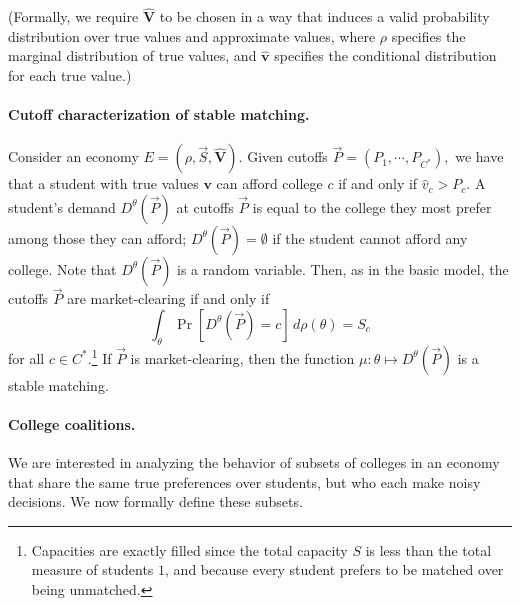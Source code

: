 \documentclass[10pt]{article}
\begin{document}
\begin{ReviewVerbatim}
(Formally, we require $\hat{\bm{V}}$ to be chosen in a way that induces a valid probability distribution over true values and approximate values, where $\rho$ specifies the marginal distribution of true values, and $\hat{\bm{v}}$ specifies the conditional distribution for each true value.)

\paragraph{Cutoff characterization of stable matching.}
Consider an economy $E=(\rho, \vec{S}, \hat{\bm{V}}).$ Given cutoffs $\vec{P} = (P_1, \cdots, P_{C^*}),$ we have that a student with true values $\bm{v}$ can afford college $c$ if and only if $\hat{v}_c > P_c$. A student's demand $D^{\theta}(\vec{P})$ at cutoffs $\vec{P}$ is equal to the college they most prefer among those they can afford; $D^{\theta}(\vec{P})=\emptyset$ if the student cannot afford any college. Note that $D^{\theta}(\vec{P})$ is a random variable. Then, as in the basic model, the cutoffs $\vec{P}$ are market-clearing if and only if
\begin{equation}
    \int_{\theta} \Pr[D^{\theta}(\vec{P})=c]\,d\rho(\theta) = S_c
\end{equation}
for all $c\in {C^*}$.\footnote{Capacities are exactly filled since the total capacity $S$ is less than the total measure of students $1$, and because every student prefers to be matched over being unmatched.} If $\vec{P}$ is market-clearing, then the function $\mu:\theta\mapsto D^{\theta}(\vec{P})$ is a stable matching.

\paragraph{College coalitions.}
We are interested in analyzing the behavior of subsets of colleges in an economy that share the same true preferences over students, but who each make noisy decisions. We now formally define these subsets.


\end{ReviewVerbatim}
\end{document}
